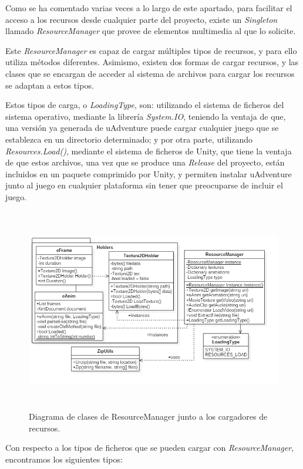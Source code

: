 Como se ha comentado varias veces a lo largo de este apartado, para facilitar el acceso a los recursos desde cualquier parte del proyecto, existe un \textit{Singleton} llamado \textit{ResourceManager} que provee de elementos multimedia al que lo solicite.

Este \textit{ResourceManager} es capaz de cargar múltiples tipos de recursos, y para ello utiliza métodos diferentes. Asimismo, existen dos formas de cargar recursos, y las clases que se encargan de acceder al sistema de archivos para cargar los recursos se adaptan a estos tipos.

Estos tipos de carga, o \textit{LoadingType}, son: utilizando el sistema de ficheros del sistema operativo, mediante la librería \textit{System.IO}, teniendo la ventaja de que, una versión ya generada de uAdventure puede cargar cualquier juego que se establezca en un directorio determinado; y por otra parte, utilizando \textit{Resources.Load()}, mediante el sistema de ficheros de Unity, que tiene la ventaja de que estos archivos, una vez que se produce una \textit{Release} del proyecto, están incluidos en un paquete comprimido por Unity, y permiten instalar uAdventure junto al juego en cualquier plataforma sin tener que preocuparse de incluir el juego.

\begin{figure}[h!]
	\centerline{\includegraphics[height=3.5in]{figures/it2/ResourceManager.png}}
	\caption[ResourceManager - Versión Final]{Diagrama de clases de ResourceManager junto a los cargadores de recursos.}
	\label{resourcemanagerit2}
\end{figure}

Con respecto a los tipos de ficheros que se pueden cargar con \textit{ResourceManager}, encontramos los siguientes tipos:

